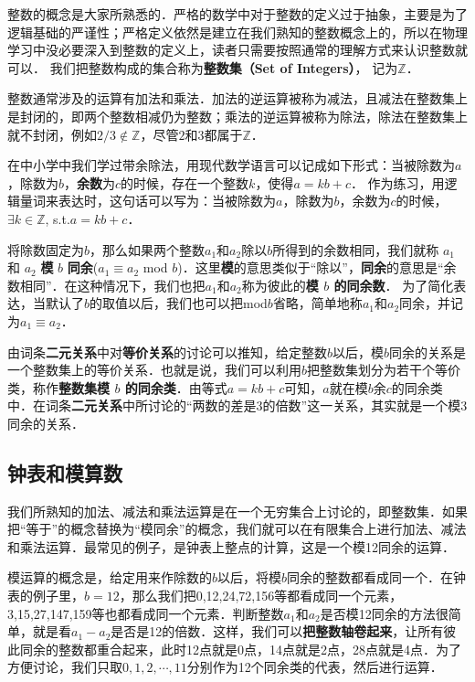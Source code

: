 
整数的概念是大家所熟悉的．严格的数学中对于整数的定义过于抽象，主要是为了逻辑基础的严谨性；严格定义依然是建立在我们熟知的整数概念上的，所以在物理学习中没必要深入到整数的定义上，读者只需要按照通常的理解方式来认识整数就可以． 我们把整数构成的集合称为\textbf{整数集（Set of Integers）}， 记为$\mathbb{Z}$．

整数通常涉及的运算有加法和乘法．加法的逆运算被称为减法，且减法在整数集上是封闭的，即两个整数相减仍为整数；乘法的逆运算被称为除法，除法在整数集上就不封闭，例如$2/3\not\in\mathbb{Z}$，尽管$2$和$3$都属于$\mathbb{Z}$．

在中小学中我们学过带余除法，用现代数学语言可以记成如下形式：当被除数为$a$，除数为$b$，\textbf{余数}为$c$的时候，存在一个整数$k$，使得$a=kb+c$． 作为练习，用逻辑量词来表达时，这句话可以写为：当被除数为$a$，除数为$b$，余数为$c$的时候，$\exists k\in \mathbb{Z}$, s.t.$ a=kb+c$． 

将除数固定为$b$，那么如果两个整数$a_1$和$a_2$除以$b$所得到的余数相同，我们就称 $a_1$ 和 $a_2$ \textbf{模} $b$ \textbf{同余}($a_1\equiv a_2$ mod $b$)．这里\textbf{模}的意思类似于“除以”，\textbf{同余}的意思是“余数相同”．在这种情况下，我们也把$a_1$和$a_2$称为彼此的\textbf{模 $b$ 的同余数}． 为了简化表达，当默认了$b$的取值以后，我们也可以把mod$b$省略，简单地称$a_1$和$a_2$同余，并记为$a_1\equiv a_2$． 

由词条\textbf{二元关系}中对\textbf{等价关系}的讨论可以推知，给定整数$b$以后，模$b$同余的关系是一个整数集上的等价关系．也就是说，我们可以利用$b$把整数集划分为若干个等价类，称作\textbf{整数集模 $b$ 的同余类}．由等式$a=kb+c$可知，$a$就在模$b$余$c$的同余类中．在词条\textbf{二元关系}中所讨论的“两数的差是3的倍数”这一关系，其实就是一个模3同余的关系．

\subsection{钟表和模算数}

我们所熟知的加法、减法和乘法运算是在一个无穷集合上讨论的，即整数集．如果把“等于”的概念替换为“模同余”的概念，我们就可以在有限集合上进行加法、减法和乘法运算．最常见的例子，是钟表上整点的计算，这是一个模12同余的运算．

模运算的概念是，给定用来作除数的$b$以后，将模$b$同余的整数都看成同一个．在钟表的例子里，$b=12$，那么我们把0,12,24,72,156等都看成同一个元素，3,15,27,147,159等也都看成同一个元素．判断整数$a_1$和$a_2$是否模12同余的方法很简单，就是看$a_1-a_2$是否是12的倍数．这样，我们可以\textbf{把整数轴卷起来}，让所有彼此同余的整数都重合起来，此时12点就是0点，14点就是2点，28点就是4点．为了方便讨论，我们只取$0,1,2,\cdots,11$分别作为12个同余类的代表，然后进行运算．

